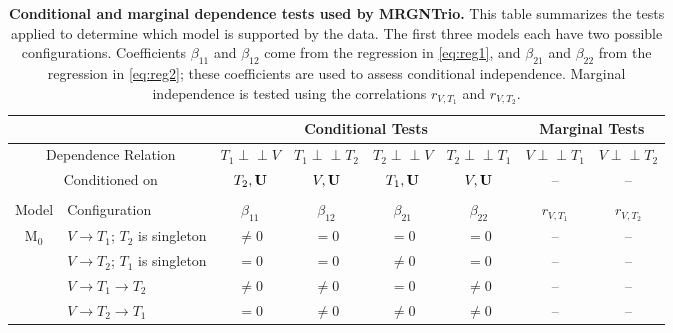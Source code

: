 \documentclass[12pt,letterpaper]{report}
\newcommand{\indep}{\perp \!\!\! \perp}
\begin{document}
\begin{table}[H]
	\centering
	\caption{\textbf{Conditional and marginal dependence tests used by MRGNTrio.} This table summarizes the tests applied to determine which model is supported by the data. The first three models each have two possible configurations. Coefficients $\beta_{11}$ and $\beta_{12}$ come from the regression in \autoref{eq:reg1}, and $\beta_{21}$ and $\beta_{22}$ from the regression in \autoref{eq:reg2}; these coefficients are used to assess conditional independence. Marginal independence is tested using the correlations $r_{V, T_1}$ and $r_{V, T_2}$.}
	\renewcommand{\arraystretch}{0.9}
	\begin{tabular}{c|p{2.8cm}|cccc|cc} 
		\toprule[0.04cm]
		\multicolumn{2}{c|}{} & \multicolumn{4}{c}{Conditional Tests} & \multicolumn{2}{|c}{Marginal Tests}  \\ 
		\midrule
		
		\multicolumn{2}{c|}{Dependence Relation} 
		& $T_1\indep V$ 
		& \small $T_1 \indep T_2$ 
		& \small $T_2\indep V$
		& \small $T_2\indep T_1$ 
		& \small $V\indep T_1$ 
		& \small $V \indep T_2$    \\
		
		\multicolumn{2}{c|}{Conditioned on} 
		& \small $T_2, {\bf U}$
		& \small $V, {\bf U}$
		& \small $T_1, {\bf U}$
		& \small $V, {\bf U}$
		& \small -- 
		& \small --    \\
		
		\multicolumn{2}{c|}{ } & \multicolumn{4}{c|}{ } & \multicolumn{2}{c}{ }  \\
		
		Model & Configuration & $\beta_{11}$ & $\beta_{12}$ & $\beta_{21}$ & $\beta_{22}$ & $r_{V, T_1}$ &  $r_{V, T_2}$ \\ 
		\midrule[0.04cm]
		
		\multirow{4}{*}{M$_0$} & \small $V \rightarrow T_1$; $T_2$ is singleton & $\neq 0$ & $= 0$ & $=0$ & $=0$ & -- &  --  \\ 
		
		& \small $V \rightarrow T_2$; $T_1$ is singleton &  $= 0$ & $= 0$ & $\neq 0$ & $= 0$ & -- & -- \\ 
		\midrule
		
		\multirow{2}{*}{M$_1$} \small & $V \rightarrow T_1 \rightarrow T_2$ & $\neq 0$ & $\neq 0$ & $= 0$ & $\neq 0$ & -- & -- \\  
		
		& \small $V \rightarrow T_2 \rightarrow T_1$ & $ = 0$ & $\neq0$ & $\neq0$ & $\neq 0$ & -- & -- \\ 
		\midrule
		

\end{tabular}
\end{table}
\end{document}
